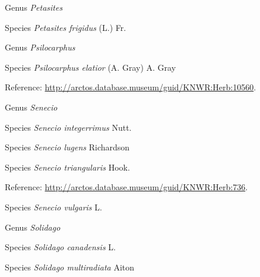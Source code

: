 \documentclass[9pt, article]{memoir}
\begin{document}
\begin{multicols}{2}
\vspace{6pt}\noindent\hspace{30pt}Genus \textit{Petasites}


\vspace{6pt}\noindent\hspace{36pt}Species \textit{Petasites frigidus} (L.) Fr.


\vspace{6pt}\noindent\hspace{30pt}Genus \textit{Psilocarphus}


\vspace{6pt}\noindent\hspace{36pt}Species \textit{Psilocarphus elatior} (A. Gray) A. Gray


\vspace{6pt}Reference: 
\url{http://arctos.database.museum/guid/KNWR:Herb:10560}.

\vspace{6pt}\noindent\hspace{30pt}Genus \textit{Senecio}


\vspace{6pt}\noindent\hspace{36pt}Species \textit{Senecio integerrimus} Nutt.


\vspace{6pt}\noindent\hspace{36pt}Species \textit{Senecio lugens} Richardson


\vspace{6pt}\noindent\hspace{36pt}Species \textit{Senecio triangularis} Hook.


\vspace{6pt}Reference: 
\url{http://arctos.database.museum/guid/KNWR:Herb:736}.

\vspace{6pt}\noindent\hspace{36pt}Species \textit{Senecio vulgaris} L.


\vspace{6pt}\noindent\hspace{30pt}Genus \textit{Solidago}


\vspace{6pt}\noindent\hspace{36pt}Species \textit{Solidago canadensis} L.


\vspace{6pt}\noindent\hspace{36pt}Species \textit{Solidago multiradiata} Aiton



\end{multicols}
\end{document}
